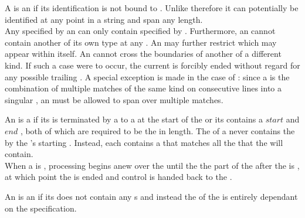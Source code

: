 A  is an  if its identification is not bound to . Unlike  therefore it can potentially be identified at any point in a string and span any length. \\

Any  specified by an  can only contain  specified by . Furthermore, an  cannot contain another  of its own type at any . An  may further restrict which  may appear within itself. An  cannot cross the boundaries of another  of a different kind. If such a case were to occur, the current  is forcibly ended without regard for any possible trailing . A special exception is made in the case of : since a  is the combination of multiple matches of the same kind on consecutive lines into a singular , an  must be allowed to span over multiple matches.

An  is a  if its  is terminated by a  to a  at the start of the  or its  contains a \inline$start$ and \inline$end$ , both of which are required to be the  in length. The  of a  never contains the   by the 's starting . Instead, each   contains a  that matches all the  that the  will contain. \\

When a  is , processing begins anew over the  until the the part of the  after the  is , at which point the  is ended and control is handed back to the .

An  is an  if its  does not contain any s and instead the  of the  is entirely dependant on the  specification. \\


